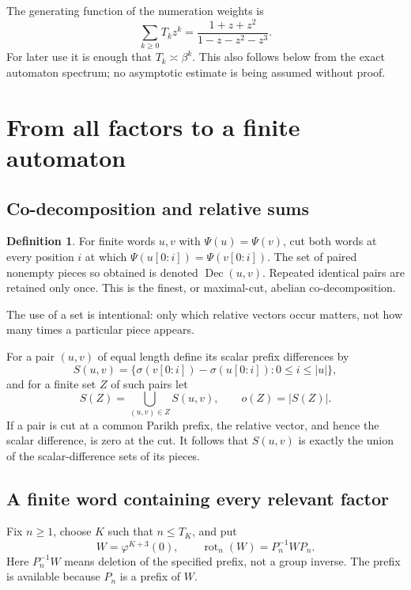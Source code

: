 \documentclass[11pt,a4paper]{article}
\theoremstyle{definition}
\newtheorem{definition}[theorem]{Definition}
\theoremstyle{remark}
\newcommand{\Dec}{\operatorname{Dec}}
\newcommand{\rot}{\operatorname{rot}}
\begin{document}
The generating function of the numeration weights is
\begin{equation}\label{eq:Tgf}
 \sum_{k\ge0}T_kz^k=\frac{1+z+z^2}{1-z-z^2-z^3}.
\end{equation}
For later use it is enough that $T_k\asymp\beta^k$. This also follows below
from the exact automaton spectrum; no asymptotic estimate is being assumed
without proof.

\section{From all factors to a finite automaton}
\label{sec:automaton}

\subsection{Co-decomposition and relative sums}
\begin{definition}
For finite words $u,v$ with $\Psi(u)=\Psi(v)$, cut both words at every
position $i$ at which $\Psi(u[0:i])=\Psi(v[0:i])$. The set of paired
nonempty pieces so obtained is denoted $\Dec(u,v)$. Repeated identical
pairs are retained only once. This is the finest, or maximal-cut,
abelian co-decomposition.
\end{definition}
The use of a set is intentional: only which relative vectors occur matters,
not how many times a particular piece appears.

For a pair $(u,v)$ of equal length define its scalar prefix differences by
\[
 S(u,v)=\{\sigma(v[0:i])-\sigma(u[0:i]):0\le i\le|u|\},
\]
and for a finite set $Z$ of such pairs let
\begin{equation}\label{eq:out}
 S(Z)=\bigcup_{(u,v)\in Z}S(u,v),\qquad o(Z)=|S(Z)|.
\end{equation}
If a pair is cut at a common Parikh prefix, the relative vector, and hence
the scalar difference, is zero at the cut. It follows that $S(u,v)$ is
exactly the union of the scalar-difference sets of its pieces.

\subsection{A finite word containing every relevant factor}
Fix $n\ge1$, choose $K$ such that $n\le T_K$, and put
\[
 W=\varphi^{K+3}(0),\qquad
 \rot_n(W)=P_n^{-1}WP_n.
\]
Here $P_n^{-1}W$ means deletion of the specified prefix, not a group
inverse. The prefix is available because $P_n$ is a prefix of $W$.
\end{document}
